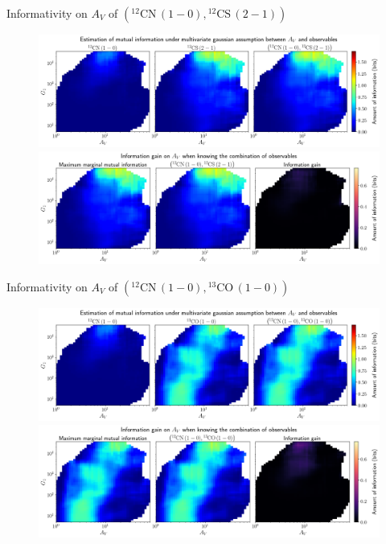 \documentclass{beamer}
\begin{document}
\begin{frame}{Informativity on $A_V$ of $\left(\mathrm{^{12}CN\,(1-0)},\mathrm{^{12}CS\,(2-1)}\right)$}
    \begin{figure}
        \centering
        \includegraphics[width=0.95\linewidth]{../linearinfogauss/av__12cn10_12cs21_linearinfogauss.png}
        \vfill
        \includegraphics[width=0.95\linewidth]{../linearinfogauss/av__12cn10_12cs21_linearinfogauss_gain.png}
    \end{figure}
\end{frame}

\begin{frame}{Informativity on $A_V$ of $\left(\mathrm{^{12}CN\,(1-0)},\mathrm{^{13}CO\,(1-0)}\right)$}
    \begin{figure}
        \centering
        \includegraphics[width=0.95\linewidth]{../linearinfogauss/av__12cn10_13co10_linearinfogauss.png}
        \vfill
        \includegraphics[width=0.95\linewidth]{../linearinfogauss/av__12cn10_13co10_linearinfogauss_gain.png}
    \end{figure}
\end{frame}
\end{document}
